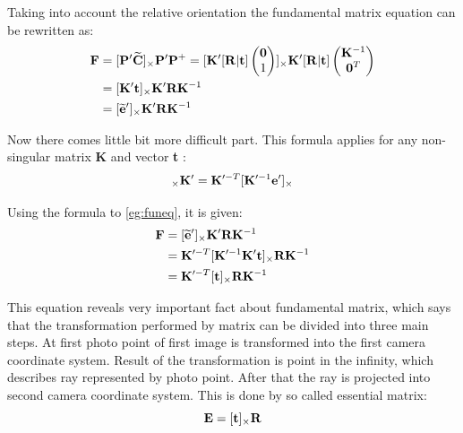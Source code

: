 \documentclass[a4paper,12pt]{article}
\newcommand{\ematr}[1]{
{\bf #1}
}
\newcommand{\evect}[1]{
{\bf #1}
}
\newcommand{\ehvect}[1]{
{\bf \widetilde{#1}}
}
\begin{document}
Taking into account the relative orientation the fundamental matrix equation can be rewritten as:
\begin{equation}
\label{eg:funeq}
\begin{split}
\ematr{F}  &= [\ematr{P}'\ehvect{C}]_{\times} \ematr{P}'\ematr{P}^{+}
= [\ematr{K}' [\ematr{R}|\evect{t}]
\begin{pmatrix}
   \evect{0} \\
    1 \\
\end{pmatrix}]
_{\times} 
\ematr{K}' [\ematr{R}|\evect{t}]  
\begin{pmatrix}
   \evect{K}^{-1} \\
   \evect{0}^{T} \\
\end{pmatrix} \\
&= [\ematr{K}' \evect{t}]_{\times} \ematr{K}'\ematr{R}\ematr{K}^{-1} \\
&= [\ehvect{e}']_{\times} \ematr{K}'\ematr{R}\ematr{K}^{-1} 
\end{split}
\end{equation}

Now there comes little bit more difficult part.
This formula applies for any non-singular matrix \ematr{K} and vector \evect{t}:
\begin{equation}
[\evect{e}']_{\times} \ematr{K'} = \ematr{K}'^{-T}[\ematr{K}'^{-1}\evect{e}']_{\times}
\end{equation}

Using the formula to \eqref{eg:funeq}, it is given:  
\begin{equation}
\begin{split}
\ematr{F}  &= [\ehvect{e}']_{\times} \ematr{K}' \ematr{R} \ematr{K}^{-1} \\
	   &= \ematr{K}'^{-T} [\ematr{K}'^{-1} \ematr{K}' \evect{t}]_{\times} \ematr{R} \ematr{K}^{-1} \\
	   &= \ematr{K}'^{-T} [\evect{t}]_{\times} \ematr{R} \ematr{K}^{-1}
\end{split}
\end{equation}

This equation reveals very important fact about fundamental matrix, which says that the transformation performed 
by matrix can be divided into three main steps.
At first photo point of first image is transformed into the first camera coordinate system. Result of the transformation is 
point in the infinity, which describes ray represented by photo point. 
After that the ray is projected into second camera coordinate system. This is done by so called essential matrix:
\begin{equation}
	 \ematr{E}  = [\evect{t}]_{\times} \ematr{R}
\end{equation}
\end{document}
